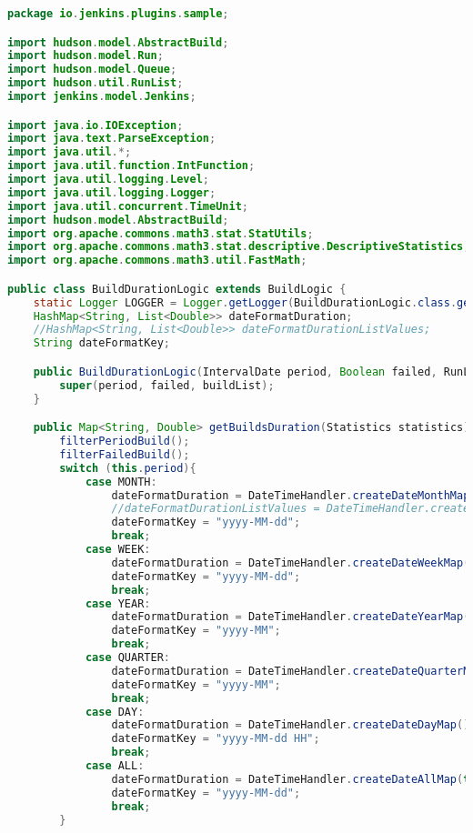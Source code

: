 \begin{lstlisting}[language=Java]
package io.jenkins.plugins.sample;

import hudson.model.AbstractBuild;
import hudson.model.Run;
import hudson.model.Queue;
import hudson.util.RunList;
import jenkins.model.Jenkins;

import java.io.IOException;
import java.text.ParseException;
import java.util.*;
import java.util.function.IntFunction;
import java.util.logging.Level;
import java.util.logging.Logger;
import java.util.concurrent.TimeUnit;
import hudson.model.AbstractBuild;
import org.apache.commons.math3.stat.StatUtils;
import org.apache.commons.math3.stat.descriptive.DescriptiveStatistics;
import org.apache.commons.math3.util.FastMath;

public class BuildDurationLogic extends BuildLogic {
    static Logger LOGGER = Logger.getLogger(BuildDurationLogic.class.getName());
    HashMap<String, List<Double>> dateFormatDuration;
    //HashMap<String, List<Double>> dateFormatDurationListValues;
    String dateFormatKey;

    public BuildDurationLogic(IntervalDate period, Boolean failed, RunList<Run> buildList) {
        super(period, failed, buildList);
    }

    public Map<String, Double> getBuildsDuration(Statistics statistics) throws ParseException {
        filterPeriodBuild();
        filterFailedBuild();
        switch (this.period){
            case MONTH:
                dateFormatDuration = DateTimeHandler.createDateMonthMap();
                //dateFormatDurationListValues = DateTimeHandler.createDateMonthMap();
                dateFormatKey = "yyyy-MM-dd";
                break;
            case WEEK:
                dateFormatDuration = DateTimeHandler.createDateWeekMap();
                dateFormatKey = "yyyy-MM-dd";
                break;
            case YEAR:
                dateFormatDuration = DateTimeHandler.createDateYearMap();
                dateFormatKey = "yyyy-MM";
                break;
            case QUARTER:
                dateFormatDuration = DateTimeHandler.createDateQuarterMap();
                dateFormatKey = "yyyy-MM";
                break;
            case DAY:
                dateFormatDuration = DateTimeHandler.createDateDayMap();
                dateFormatKey = "yyyy-MM-dd HH";
                break;
            case ALL:
                dateFormatDuration = DateTimeHandler.createDateAllMap(this.buildList);
                dateFormatKey = "yyyy-MM-dd";
                break;
        }



\end{lstlisting}
